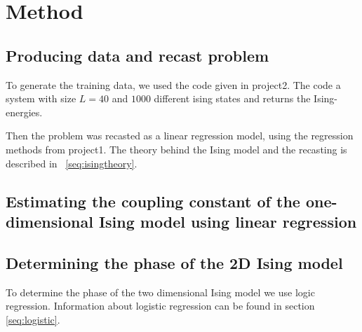 \section{Method}

\subsection{Producing data and recast problem}
To generate the training data, we used the code given in 
project2. 
The code a system with size \(L=40\) and \(1000\) different 
ising states and returns the Ising-energies. 

Then the problem was recasted as a linear regression model, using 
the regression methods from project1. The theory behind 
the Ising model and the recasting is described in ~\ref{seq:isingtheory}.

\subsection{Estimating the coupling constant of the one-dimensional Ising model using linear regression}

\subsection{Determining the phase of the 2D Ising model}
To determine the phase of the two dimensional Ising model we use 
logic regression. Information about logistic regression can be found 
in section \ref{seq:logistic}.





